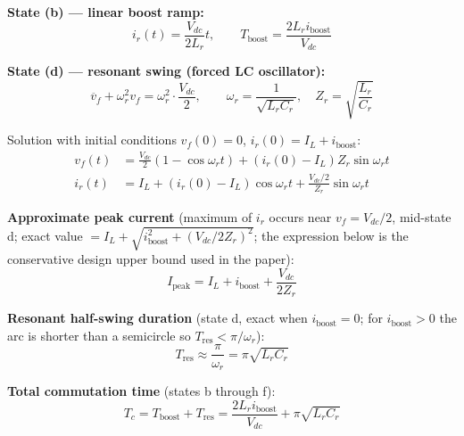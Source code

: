 \documentclass[12pt, a4paper]{article}
\def\,{ }%
\newcommand{\Vdc}{V_{dc}}
\newcommand{\vf}{v_f}
\newcommand{\ir}{i_r}
\newcommand{\IL}{I_L}
\newcommand{\Lr}{L_r}
\newcommand{\Cr}{C_r}
\newcommand{\omegar}{\omega_r}
\newcommand{\Zr}{Z_r}
\begin{document}
\begin{eqnbox}
\textbf{State (b) — linear boost ramp:}
\begin{equation}
    \ir(t) = \frac{\Vdc}{2\Lr}\,t, \qquad
    T_\text{boost} = \frac{2\Lr\,i_\text{boost}}{\Vdc}
    \label{eq:T_boost}
\end{equation}

\textbf{State (d) — resonant swing (forced LC oscillator):}
\begin{equation}
    \ddot{\vf} + \omegar^2\,\vf = \omegar^2\cdot\frac{\Vdc}{2},
    \qquad \omegar = \frac{1}{\sqrt{\Lr\Cr}},\quad \Zr = \sqrt{\frac{\Lr}{\Cr}}
    \label{eq:swing_ode}
\end{equation}

Solution with initial conditions $\vf(0)=0$, $\ir(0)=\IL+i_\text{boost}$:
\begin{align}
    \vf(t)  &= \frac{\Vdc}{2}(1 - \cos\omegar t)
               + (\ir(0)-\IL)\,\Zr\sin\omegar t
    \label{eq:vf_swing} \\[4pt]
    \ir(t)  &= \IL + (\ir(0)-\IL)\cos\omegar t
               + \frac{\Vdc/2}{\Zr}\sin\omegar t
    \label{eq:ir_swing}
\end{align}

\textbf{Approximate peak current} (maximum of $\ir$ occurs near $\vf = \Vdc/2$,
mid-state d; exact value $= \IL + \sqrt{i_\text{boost}^2 + (\Vdc/2\Zr)^2}$;
the expression below is the conservative design upper bound used in the paper):
\begin{equation}
    I_\text{peak} = \IL + i_\text{boost} + \frac{\Vdc}{2\Zr}
    \label{eq:Ipeak_diode}
\end{equation}

\textbf{Resonant half-swing duration} (state d, exact when $i_\text{boost}=0$;
for $i_\text{boost}>0$ the arc is shorter than a semicircle so
$T_\text{res} < \pi/\omegar$):
\begin{equation}
    T_\text{res} \approx \frac{\pi}{\omegar} = \pi\sqrt{\Lr\Cr}
    \label{eq:T_res}
\end{equation}

\textbf{Total commutation time} (states b through f):
\begin{equation}
    T_c = T_\text{boost} + T_\text{res}
        = \frac{2\Lr\,i_\text{boost}}{\Vdc} + \pi\sqrt{\Lr\Cr}
    \label{eq:T_comm_diode}
\end{equation}
\end{eqnbox}
\end{document}
